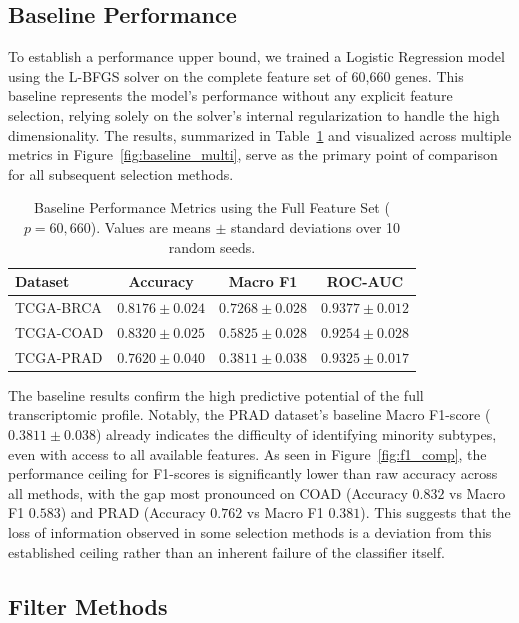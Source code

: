 \documentclass{article}
\begin{document}
\subsection{Baseline Performance}

To establish a performance upper bound, we trained a Logistic Regression model using the L-BFGS solver on the complete feature set of 60,660 genes. This baseline represents the model's performance without any explicit feature selection, relying solely on the solver's internal regularization to handle the high dimensionality. The results, summarized in Table~\ref{tab:baseline_metrics} and visualized across multiple metrics in Figure~\ref{fig:baseline_multi}, serve as the primary point of comparison for all subsequent selection methods.

\begin{table}[htbp]
\centering
\caption{Baseline Performance Metrics using the Full Feature Set ($p=60{,}660$). Values are means $\pm$ standard deviations over 10 random seeds.}
\label{tab:baseline_metrics}
\begin{tabular}{@{}lccc@{}}
\toprule
\textbf{Dataset} & \textbf{Accuracy} & \textbf{Macro F1} & \textbf{ROC-AUC}  \\
\midrule
TCGA-BRCA & $0.8176 \pm 0.024$ & $0.7268 \pm 0.028$ & $0.9377 \pm 0.012$ \\
TCGA-COAD & $0.8320 \pm 0.025$ & $0.5825 \pm 0.028$ & $0.9254 \pm 0.028$ \\
TCGA-PRAD & $0.7620 \pm 0.040$ & $0.3811 \pm 0.038$ & $0.9325 \pm 0.017$ \\
\bottomrule
\end{tabular}
\end{table}

The baseline results confirm the high predictive potential of the full transcriptomic profile. Notably, the PRAD dataset's baseline Macro F1-score ($0.3811 \pm 0.038$) already indicates the difficulty of identifying minority subtypes, even with access to all available features. As seen in Figure~\ref{fig:f1_comp}, the performance ceiling for F1-scores is significantly lower than raw accuracy across all methods, with the gap most pronounced on COAD (Accuracy $0.832$ vs Macro F1 $0.583$) and PRAD (Accuracy $0.762$ vs Macro F1 $0.381$). This suggests that the loss of information observed in some selection methods is a deviation from this established ceiling rather than an inherent failure of the classifier itself.


\subsection{Filter Methods}
\end{document}
